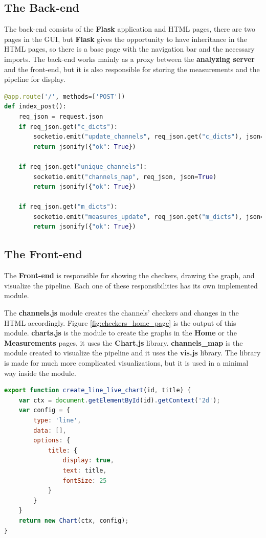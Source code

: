 \subsection{The Back-end}
The back-end consists of the \textbf{Flask} application and HTML pages, there are two pages in the
GUI, but \textbf{Flask} gives the opportunity to have inheritance in the HTML pages, so there is
a base page with the navigation bar and the necessary imports. The back-end works mainly as a proxy
between the \textbf{analyzing server} and the front-end, but it is also responsible for storing 
the measurements and the pipeline for display.
\newline
\begin{lstlisting}[language=Python, caption={Post requests handling for the home page},captionpos=b]
@app.route('/', methods=['POST'])
def index_post():
	req_json = request.json
	if req_json.get("c_dicts"):
		socketio.emit("update_channels", req_json.get("c_dicts"), json=True)
		return jsonify({"ok": True})

	if req_json.get("unique_channels"):
		socketio.emit("channels_map", req_json, json=True)
		return jsonify({"ok": True})

	if req_json.get("m_dicts"):
		socketio.emit("measures_update", req_json.get("m_dicts"), json=True)
		return jsonify({"ok": True})
\end{lstlisting}

\subsection{The Front-end}
The \textbf{Front-end} is responsible for showing the checkers, drawing the graph, and visualize
the pipeline. Each one of these responsibilities has its own implemented module.

The \textbf{channels.js} module creates the channels' checkers and changes in the HTML accordingly. 
Figure \ref{fig:checkers_home_page} is the output of this module. \textbf{charts.js} is the module to create the graphs in the \textbf{Home} or the \textbf{Measurements}
pages, it uses the \textbf{Chart.js}\cite{chart.js} library. \textbf{channels\_map} is the module created to visualize the pipeline and it uses the \textbf{vis.js}\cite{vis.js}
library. The library is made for much more complicated visualizations, but it is used in a minimal way inside the
module.
\newline
\begin{lstlisting}[language=JavaScript, caption={Creating a graph},captionpos=b]
export function create_line_live_chart(id, title) {
	var ctx = document.getElementById(id).getContext('2d');
	var config = {
		type: 'line',
		data: [],
		options: {
			title: {
				display: true,
				text: title,
				fontSize: 25
			}
		}
	}
	return new Chart(ctx, config);
}
\end{lstlisting}

